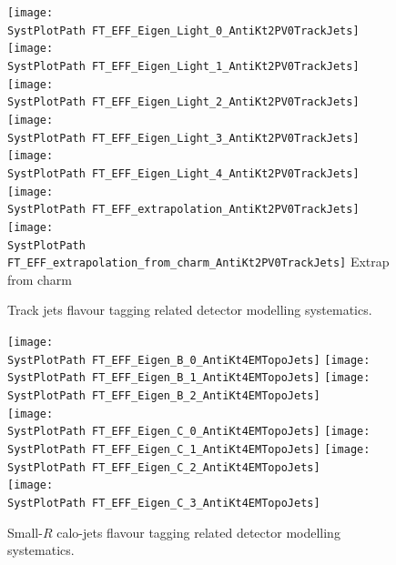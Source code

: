 \begin{figure}[!h]
\begin{center}
\texttt{[image: \\SystPlotPath FT\_EFF\_Eigen\_Light\_0\_AntiKt2PV0TrackJets]}
\texttt{[image: \\SystPlotPath FT\_EFF\_Eigen\_Light\_1\_AntiKt2PV0TrackJets]} 
\texttt{[image: \\SystPlotPath FT\_EFF\_Eigen\_Light\_2\_AntiKt2PV0TrackJets]}\\
\texttt{[image: \\SystPlotPath FT\_EFF\_Eigen\_Light\_3\_AntiKt2PV0TrackJets]} 
\texttt{[image: \\SystPlotPath FT\_EFF\_Eigen\_Light\_4\_AntiKt2PV0TrackJets]}
\texttt{[image: \\SystPlotPath FT\_EFF\_extrapolation\_AntiKt2PV0TrackJets]} \\
\texttt{[image: \\SystPlotPath FT\_EFF\_extrapolation\_from\_charm\_AntiKt2PV0TrackJets]} {}{Extrap from charm}
\caption{Track jets flavour tagging related detector modelling systematics.}
\label{fig:systplots_btag_trkjet_2}
\end{center}
\end{figure}

\begin{figure}[!h]
\begin{center}
\texttt{[image: \\SystPlotPath FT\_EFF\_Eigen\_B\_0\_AntiKt4EMTopoJets]}
\texttt{[image: \\SystPlotPath FT\_EFF\_Eigen\_B\_1\_AntiKt4EMTopoJets]}   
\texttt{[image: \\SystPlotPath FT\_EFF\_Eigen\_B\_2\_AntiKt4EMTopoJets]}     \\
\texttt{[image: \\SystPlotPath FT\_EFF\_Eigen\_C\_0\_AntiKt4EMTopoJets]}     
\texttt{[image: \\SystPlotPath FT\_EFF\_Eigen\_C\_1\_AntiKt4EMTopoJets]} 
\texttt{[image: \\SystPlotPath FT\_EFF\_Eigen\_C\_2\_AntiKt4EMTopoJets]}    \\
\texttt{[image: \\SystPlotPath FT\_EFF\_Eigen\_C\_3\_AntiKt4EMTopoJets]}  
\caption{Small-$R$ calo-jets flavour tagging related detector modelling systematics.}
\label{fig:systplots_btag_calojet_1}
\end{center}
\end{figure}

